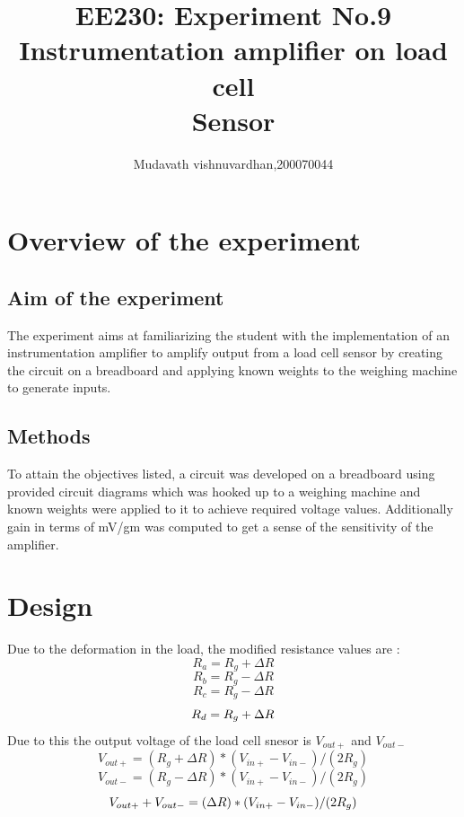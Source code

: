 \documentclass[12pt]{article}
\title{EE230: Experiment No.9\\
Instrumentation amplifier on load cell \\
Sensor}
\author{Mudavath vishnuvardhan,200070044}
\begin{document}
\maketitle


\section{Overview of the experiment} %

\subsection{Aim of the experiment}%

The experiment aims at familiarizing the student with the implementation of
an instrumentation amplifier to amplify output from a load cell sensor by
creating the circuit on a breadboard and applying known weights to the
weighing machine to generate inputs.

\subsection{Methods}
To attain the objectives listed, a circuit was developed on a breadboard using
provided circuit diagrams which was hooked up to a weighing machine and
known weights were applied to it to achieve required voltage values.
Additionally gain in terms of mV/gm was computed to get a sense of the
sensitivity of the amplifier.


\section{Design}%
Due to the deformation in the load, the modified resistance values are :
\begin{equation}
R_{a}=R_{g}+\Delta R
\end{equation}  
\begin{equation}
R_{b}=R_{g}-\Delta R
\end{equation}  
\begin{equation}
R_{c}=R_{g}-\Delta R
\end{equation}  
\begin{equation}
R_{d}=R_{g}+\Delta R\\
 \end{equation}  
 Due to this the output voltage of the load cell snesor is \(V_{out+}\) and \(V_{out-}\)
 \begin{equation}
V_{out+}=(R_{g}+\Delta R )*(V_{in+}-V_{in-})/ (2R_{g})
\end{equation} 
\begin{equation} 
V_{out-}=(R_{g}-\Delta R )*(V_{in+}-V_{in-})/ (2R_{g})
\end{equation} 
\begin{equation}
V_{out+}+V_{out-}=(\Delta R )*(V_{in+}-V_{in-})/ (2R_{g})\\
 \end{equation}  
\end{document}
